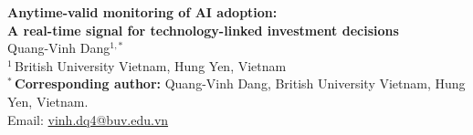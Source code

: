 \documentclass[12pt]{article}
\begin{document}
\begin{center}
{\Large\bfseries Anytime-valid monitoring of AI adoption:\\[2pt]
A real-time signal for technology-linked investment decisions}\\[24pt]
{\large Quang-Vinh Dang$^{1,*}$}\\[10pt]
$^{1}$\,British University Vietnam, Hung Yen, Vietnam\\[6pt]
$^{*}$\,\textbf{Corresponding author:} Quang-Vinh Dang, British University Vietnam, Hung Yen, Vietnam.\\
Email: \href{mailto:vinh.dq4@buv.edu.vn}{vinh.dq4@buv.edu.vn}
\end{center}
\end{document}
